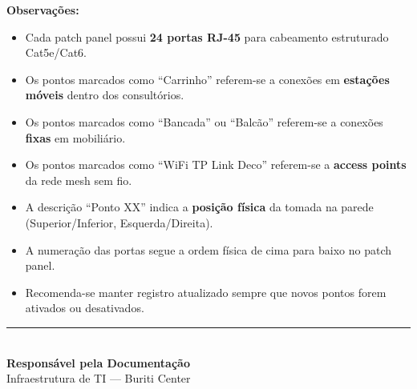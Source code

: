 \documentclass[12pt, a4paper]{article}
\begin{document}
\vspace{0.5cm}

\noindent\textbf{Observações:}
\begin{itemize}
    \item Cada patch panel possui \textbf{24 portas RJ-45} para cabeamento estruturado Cat5e/Cat6.
    \item Os pontos marcados como ``Carrinho'' referem-se a conexões em \textbf{estações móveis} dentro dos consultórios.
    \item Os pontos marcados como ``Bancada'' ou ``Balcão'' referem-se a conexões \textbf{fixas} em mobiliário.
    \item Os pontos marcados como ``WiFi TP Link Deco'' referem-se a \textbf{access points} da rede mesh sem fio.
    \item A descrição ``Ponto XX'' indica a \textbf{posição física} da tomada na parede (Superior/Inferior, Esquerda/Direita).
    \item A numeração das portas segue a ordem física de cima para baixo no patch panel.
    \item Recomenda-se manter registro atualizado sempre que novos pontos forem ativados ou desativados.
\end{itemize}

\vfill

\begin{center}
    \rule{8cm}{0.5pt} \\
    \vspace{0.3cm}
    {\large \textbf{Responsável pela Documentação}} \\
    \vspace{0.2cm}
    \textcolor{secondaryText}{Infraestrutura de TI --- Buriti Center}
\end{center}
\end{document}
